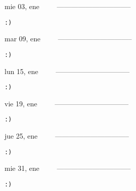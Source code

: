 \documentclass[letterpaper,10pt]{article}
\begin{document}
\begin{multicols}{3}
{mie 03, ene\ \ \ \ \ --------------------------------}
\begin{flushright}\begin{small}\texttt{:)}\end{small}\end{flushright}
\vfill
{mar 09, ene\ \ \ \ \ --------------------------------}
\begin{flushright}\begin{small}\texttt{:)}\end{small}\end{flushright}\par
\vfill
{lun 15, ene\ \ \ \ \ --------------------------------}
\begin{flushright}\begin{small}\texttt{:)}\end{small}\end{flushright}\par
\vfill
\end{multicols}
\vspace{1.05cm}

\begin{multicols}{3}
{vie 19, ene\ \ \ \ \ --------------------------------}
\begin{flushright}\begin{small}\texttt{:)}\end{small}\end{flushright}
\vfill
{jue 25, ene\ \ \ \ \ --------------------------------}
\begin{flushright}\begin{small}\texttt{:)}\end{small}\end{flushright}\par
\vfill
{mie 31, ene\ \ \ \ \ --------------------------------}
\begin{flushright}\begin{small}\texttt{:)}\end{small}\end{flushright}\par
\vfill
\end{multicols}
\vspace{1.05cm}
\end{document}
